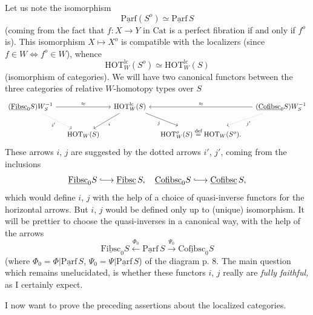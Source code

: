 \documentclass[11pt]{article}
\newcommand{\printedpage}[1]{\marginpar{\footnotesize p.~#1}}
\newcommand{\msp}[1]{\marginpar{\footnotesize [#1]}}
\newcommand{\uc}[1]{\underline{\mathrm{#1}}}
\newcommand{\HOT}{\mathrm{HOT}}
\newcommand{\Cat}{\mathrm{Cat}}
\newcommand{\defeq}{\overset{\text{def}}{=}}
\begin{document}
\msp{page 51}

Let us note the isomorphism
\[
\uc{Parf}(S^o) \simeq \uc{Parf}\,S
\]
(coming from the fact that $f : X \longrightarrow Y$ in $\Cat$ is a perfect fibration if and only if $f^o$ is). This isomorphism $X \longmapsto X^o$ is compatible with the localizers (since $f \in W \Longleftrightarrow f^o \in W$), whence
\[
\HOT^{\mathrm{lc}}_W(S^o) \simeq \HOT^{\mathrm{lc}}_W(S)
\]
(isomorphism of categories). We will have two canonical functors between the three categories of relative $W$-homotopy types over $S$
\[
\begin{tikzcd}[column sep=small]
(\uc{Fibsc}_0S)W_S^{-1} \arrow[rr, "\approx"] \arrow[dr, dotted, "i'"'] & & \HOT^{\mathrm{lc}}_W(S) \arrow[dl, "i"] \arrow[dr, "j"'] & & (\uc{Cofibsc}_0S)W_S^{-1} \arrow[ll, "\approx"'] \arrow[dl, dotted, "j'"] \\
& \HOT_W(S) & & \HOT^o_W(S) \defeq \HOT_W(S^o). &
\end{tikzcd}
\]
\printedpage{32}
 These arrows $i$, $j$ are suggested by the dotted arrows $i'$, $j'$, coming from the inclusions %
\[
\uc{Fibsc}_0S \lhook\joinrel\longrightarrow \uc{Fibsc}\,S,\quad \uc{Cofibsc}_0S \lhook\joinrel\longrightarrow \uc{Cofibsc}\,S,
\]
which would define $i$, $j$ with the help of a choice of quasi-inverse functors for the horizontal arrows. But $i$, $j$ would be defined only up to (unique) isomorphism. It will be prettier to choose the quasi-inverses in a canonical way, with the help of the arrows
\[
\uc{Fibsc}_0S \xleftarrow{\Phi_0} \uc{Parf}\,S \xrightarrow{\Psi_0} \uc{Cofibsc}_0S
\]
(where $\Phi_0 = \Phi|\uc{Parf}\,S$, $\Psi_0 = \Psi|\uc{Parf}\,S$) of the diagram p. 8. The main question
\msp{page 52}
which remains unelucidated, is whether these functors $i$, $j$ really are \textit{fully faithful,} as I certainly expect.

I now want to prove the preceding assertions about the localized categories.
\end{document}
